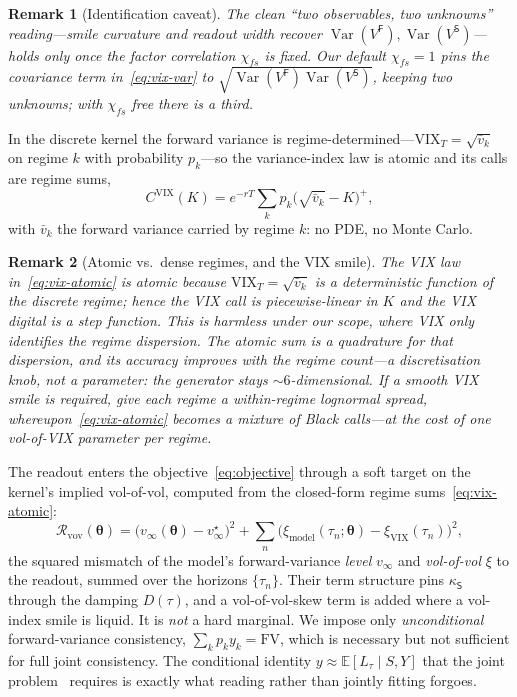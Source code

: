 \documentclass[11pt]{article}
\newtheorem{remark}{Remark}
\newcommand{\E}{\mathbb{E}}
\newcommand{\Var}{\operatorname{Var}}
\newcommand{\cR}{\mathcal{R}}
\newcommand{\VIX}{\mathrm{VIX}}
\newcommand{\bth}{{\boldsymbol{\theta}}}
\begin{document}
\begin{remark}[Identification caveat]
The clean ``two observables, two unknowns'' reading---smile curvature and readout width
recover $\Var(V^{\mathsf F}),\Var(V^{\mathsf S})$---holds only once the factor correlation $\chi_{fs}$ is
fixed. Our default $\chi_{fs}=1$ pins the covariance term
in~\eqref{eq:vix-var} to $\sqrt{\Var(V^{\mathsf F})\Var(V^{\mathsf S})}$, keeping two unknowns; with
$\chi_{fs}$ free there is a third.
\end{remark}

In the discrete kernel the forward variance is regime-determined---$\VIX_T=\sqrt{\bar v_k}$
on regime $k$ with probability $p_k$---so the variance-index law is atomic and its calls are
regime sums,
\begin{equation}
C^{\VIX}(K)=e^{-rT}\sum_k p_k\big(\sqrt{\bar v_k}-K\big)^+,
\label{eq:vix-atomic}
\end{equation}
with $\bar v_k$ the forward variance carried by regime $k$: no PDE, no Monte Carlo.

\begin{remark}[Atomic vs.\ dense regimes, and the VIX smile]
\label{rem:atomic}
The VIX law in~\eqref{eq:vix-atomic} is atomic because $\VIX_T=\sqrt{\bar v_k}$ is a
deterministic function of the discrete regime; hence the VIX call is piecewise-linear
in $K$ and the VIX digital is a step function. This is harmless under our scope, where
VIX only \emph{identifies} the regime dispersion. The atomic sum is a quadrature for that
dispersion, and its accuracy improves with the regime count---a discretisation knob, not a
parameter: the generator stays $\sim\!6$-dimensional. If a smooth VIX smile is
required, give each regime a within-regime lognormal spread,
whereupon~\eqref{eq:vix-atomic} becomes a mixture of Black calls---at the cost of one
vol-of-VIX parameter per regime.
\end{remark}

The readout enters the objective~\eqref{eq:objective} through a soft target on the kernel's
implied vol-of-vol, computed from the closed-form regime sums~\eqref{eq:vix-atomic}:
\begin{equation}
\cR_{\mathrm{vov}}(\bth)=\big(v_\infty(\bth)-v_\infty^\star\big)^2
+\sum_n\big(\xi_{\mathrm{model}}(\tau_n;\bth)-\xi_{\VIX}(\tau_n)\big)^2,
\label{eq:Rvov}
\end{equation}
the squared mismatch of the model's forward-variance \emph{level} $v_\infty$ and \emph{vol-of-vol}
$\xi$ to the readout, summed over the horizons $\{\tau_n\}$. Their term structure pins $\kappa_{\mathsf{S}}$
through the damping $D(\tau)$, and a vol-of-vol-skew term is added where a vol-index smile is
liquid. It is \emph{not} a hard marginal. We impose only \emph{unconditional} forward-variance
consistency, $\sum_k p_k y_k=\mathrm{FV}$, which is necessary but not sufficient for full joint
consistency. The conditional identity $y\approx\E[L_\tau\mid S,Y]$ that the joint
problem~\cite{guyon2022} requires is exactly what reading rather than jointly fitting forgoes.
\end{document}
